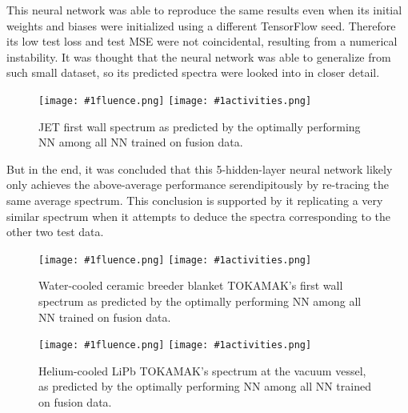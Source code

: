 \documentclass[a4paper, 12pt]{article}
\newcommand{\fluenceandactivities}[1]{
\texttt{[image: \#1fluence.png]}
\texttt{[image: \#1activities.png]}
}
\begin{document}
    This neural network was able to reproduce the same results even when its initial weights and biases were initialized using a different TensorFlow seed. Therefore its low test loss and test MSE were not coincidental, resulting from a numerical instability. It was thought that the neural network was able to generalize from such small dataset, so its predicted spectra were looked into in closer detail.

\begin{figure}[H]
\centering
\fluenceandactivities{/home/ocean/Documents/GitHubDir/unfolding/unfolding/unfoldingsuite/neuralnetwork/realoutputEarlyStopping/SelectedNNreplicated/fusion-fusion/0927_0220_5_layerfinal_inv_5_test_001_}
\caption{JET first wall spectrum as predicted by the optimally performing NN among all NN trained on fusion data.}\label{5Layerfusion-fusionJET-FW}
\end{figure}

    But in the end, it was concluded that this 5-hidden-layer neural network likely only achieves the above-average performance serendipitously by re-tracing the same average spectrum. This conclusion is supported by it replicating a very similar spectrum when it attempts to deduce the spectra corresponding to the other two test data.

\begin{figure}[H]
\centering
\fluenceandactivities{/home/ocean/Documents/GitHubDir/unfolding/unfolding/unfoldingsuite/neuralnetwork/realoutputEarlyStopping/SelectedNNreplicated/fusion-fusion/0927_0220_5_layerfinal_inv_5_test_002_}
\caption{Water-cooled ceramic breeder blanket TOKAMAK's first wall spectrum as predicted by the optimally performing NN among all NN trained on fusion data.}\label{5Layerfusion-fusionWCCB-FW}
\end{figure}

\begin{figure}[H]
\centering
\fluenceandactivities{/home/ocean/Documents/GitHubDir/unfolding/unfolding/unfoldingsuite/neuralnetwork/realoutputEarlyStopping/SelectedNNreplicated/fusion-fusion/0927_0220_5_layerfinal_inv_5_test_003_}
\caption{Helium-cooled LiPb TOKAMAK's spectrum at the vacuum vessel, as predicted by the optimally performing NN among all NN trained on fusion data.}\label{5Layerfusion-fusionHCLL-VV}
\end{figure}
\end{document}
